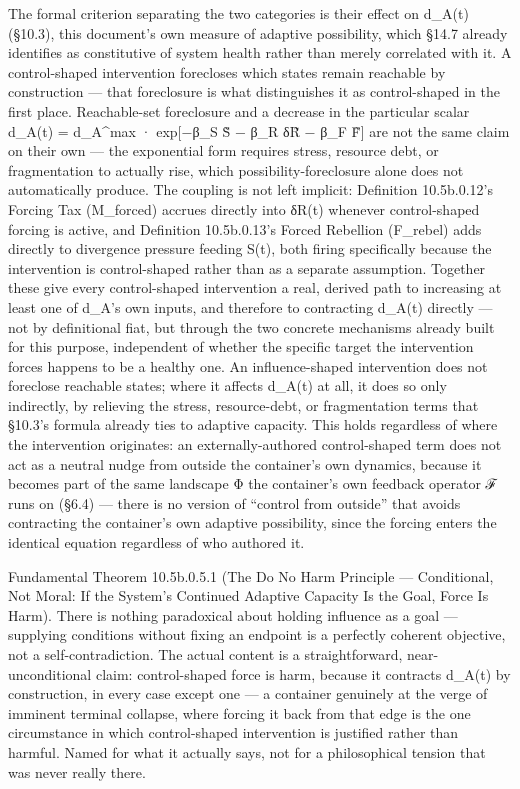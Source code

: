 \documentclass[
]{article}
\begin{document}
The formal criterion separating the two categories is their effect on
d\_A(t) (§10.3), this document's own measure of adaptive possibility,
which §14.7 already identifies as constitutive of system health rather
than merely correlated with it. A control-shaped intervention forecloses
which states remain reachable by construction --- that foreclosure is
what distinguishes it as control-shaped in the first place.
Reachable-set foreclosure and a decrease in the particular scalar
d\_A(t) = d\_A\^{}max · exp{[}−β\_S S̃ − β\_R δR̃ − β\_F F̃{]} are not the
same claim on their own --- the exponential form requires stress,
resource debt, or fragmentation to actually rise, which
possibility-foreclosure alone does not automatically produce. The
coupling is not left implicit: Definition 10.5b.0.12's Forcing Tax
(M\_forced) accrues directly into δR(t) whenever control-shaped forcing
is active, and Definition 10.5b.0.13's Forced Rebellion (F\_rebel) adds
directly to divergence pressure feeding S(t), both firing specifically
because the intervention is control-shaped rather than as a separate
assumption. Together these give every control-shaped intervention a
real, derived path to increasing at least one of d\_A's own inputs, and
therefore to contracting d\_A(t) directly --- not by definitional fiat,
but through the two concrete mechanisms already built for this purpose,
independent of whether the specific target the intervention forces
happens to be a healthy one. An influence-shaped intervention does not
foreclose reachable states; where it affects d\_A(t) at all, it does so
only indirectly, by relieving the stress, resource-debt, or
fragmentation terms that §10.3's formula already ties to adaptive
capacity. This holds regardless of where the intervention originates: an
externally-authored control-shaped term does not act as a neutral nudge
from outside the container's own dynamics, because it becomes part of
the same landscape Φ the container's own feedback operator ℱ runs on
(§6.4) --- there is no version of ``control from outside'' that avoids
contracting the container's own adaptive possibility, since the forcing
enters the identical equation regardless of who authored it.

Fundamental Theorem 10.5b.0.5.1 (The Do No Harm Principle ---
Conditional, Not Moral: If the System's Continued Adaptive Capacity Is
the Goal, Force Is Harm). There is nothing paradoxical about holding
influence as a goal --- supplying conditions without fixing an endpoint
is a perfectly coherent objective, not a self-contradiction. The actual
content is a straightforward, near-unconditional claim: control-shaped
force is harm, because it contracts d\_A(t) by construction, in every
case except one --- a container genuinely at the verge of imminent
terminal collapse, where forcing it back from that edge is the one
circumstance in which control-shaped intervention is justified rather
than harmful. Named for what it actually says, not for a philosophical
tension that was never really there.
\end{document}
